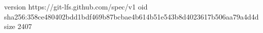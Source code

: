 version https://git-lfs.github.com/spec/v1
oid sha256:358ce480402bdd1bdf469b87bcbae4b614b51e543b8d4023617b506aa79a4d4d
size 2407
